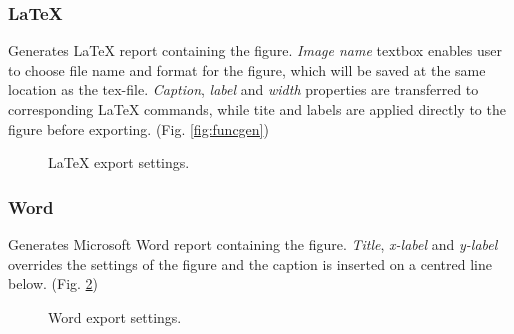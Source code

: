 \subsubsection*{LaTeX}
Generates LaTeX report containing the figure. \emph{Image name} textbox enables user to choose file name and format for the figure, which will be saved at the same location as the tex-file. \emph{Caption}, \emph{label} and \emph{width} properties are transferred to corresponding LaTeX commands, while tite and labels are applied directly to the figure before exporting. (Fig. \ref{fig:funcgen})

\begin{figure}[H]
\centering
{}
\caption{LaTeX export settings.}
\label{fig:tex}
\end{figure}

\subsubsection*{Word}
Generates Microsoft Word report containing the figure. \emph{Title}, \emph{x-label} and \emph{y-label} overrides the settings of the figure and the caption is inserted on a centred line below. (Fig. \ref{fig:word})

\begin{figure}[H]
\centering
{}
\caption{Word export settings.}
\label{fig:word}
\end{figure}

\ifdefined\master
\else
	
\fi